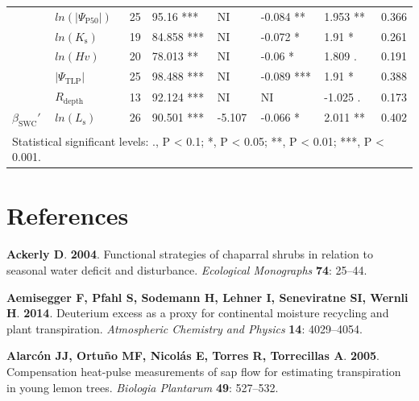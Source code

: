 \documentclass[11pt,twoside]{reedthesis}
\begin{document}
\begin{table}
{\begin{tabular}[t]{llrllllr}
\cmidrule{1-8}
 & $ln(\rvert\Psi_{\text{P50}}\rvert)$ & 25 & 95.16 *** & NI & -0.084 ** & 1.953 ** & 0.366\\
\cmidrule{2-8}
 & $ln(K_{\text{s}})$ & 19 & 84.858 *** & NI & -0.072 * & 1.91 * & 0.261\\
\cmidrule{2-8}
 & $ln(Hv)$ & 20 & 78.013 ** & NI & -0.06 * & 1.809 . & 0.191\\
\cmidrule{2-8}
 & $\rvert\Psi_{\text{TLP}}\rvert$ & 25 & 98.488 *** & NI & -0.089 *** & 1.91 * & 0.388\\
\cmidrule{2-8}
 & $R_{\text{depth}}$ & 13 & 92.124 *** & NI & NI & -1.025 . & 0.173\\
\cmidrule{2-8}
\multirow{-6}{*}{\raggedright\arraybackslash $\beta_{\text{SWC}}'$} & $ln(L_{\text{s}})$ & 26 & 90.501 *** & -5.107 & -0.066 * & 2.011 ** & 0.402\\
\bottomrule
\multicolumn{8}{l}{\textsuperscript{} Statistical significant levels: ., P < 0.1; *, P < 0.05; **, P < 0.01; ***, P < 0.001.}\\
\end{tabular}}
\end{table}
\chapter*{References}\label{references}


\noindent

\setlength{\parindent}{-0.20in} \setlength{\leftskip}{0.20in}
\setlength{\parskip}{8pt}

\hypertarget{refs}{}
\hypertarget{ref-Ackerly2004}{}
\textbf{\textnormal{Ackerly D}}. \textbf{2004}. Functional strategies of
chaparral shrubs in relation to seasonal water deficit and disturbance.
\emph{Ecological Monographs} \textbf{74}: 25--44.

\hypertarget{ref-Aemisegger2014}{}
\textbf{\textnormal{Aemisegger F}, \textnormal{Pfahl S},
\textnormal{Sodemann H}, \textnormal{Lehner I}, \textnormal{Seneviratne
SI}, \textnormal{Wernli H}}. \textbf{2014}. Deuterium excess as a proxy
for continental moisture recycling and plant transpiration.
\emph{Atmospheric Chemistry and Physics} \textbf{14}: 4029--4054.

\hypertarget{ref-Alarcon2005}{}
\textbf{\textnormal{Alarcón JJ}, \textnormal{Ortuño MF},
\textnormal{Nicolás E}, \textnormal{Torres R}, \textnormal{Torrecillas
A}}. \textbf{2005}. Compensation heat-pulse measurements of sap flow for
estimating transpiration in young lemon trees. \emph{Biologia Plantarum}
\textbf{49}: 527--532.
\end{document}
